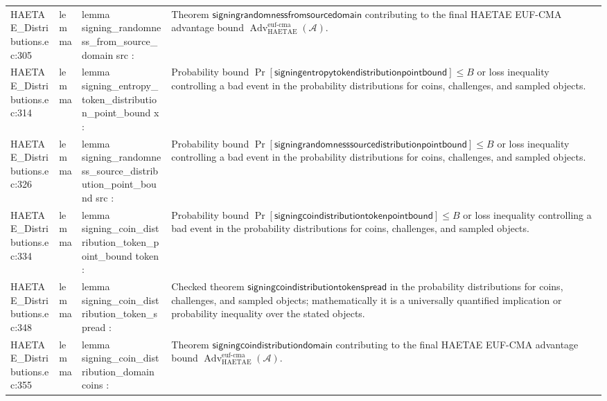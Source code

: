\documentclass[10pt]{article}
\newcommand{\Adv}{\operatorname{Adv}}
\begin{document}
\begin{longtable}{L{0.11\textwidth}L{0.055\textwidth}L{0.385\textwidth}L{0.41\textwidth}}
HAETAE\_\allowbreak{}Distributions.\allowbreak{}ec:\allowbreak{}305 & lemma & {\ttfamily\scriptsize lemma signing\_\allowbreak{}randomness\_\allowbreak{}from\_\allowbreak{}source\_\allowbreak{}domain src :} & Theorem $\mathsf{signingrandomnessfromsourcedomain}$ contributing to the final HAETAE EUF-CMA advantage bound $\Adv_{\mathrm{HAETAE}}^{\mathrm{euf\mbox{-}cma}}(\mathcal A)$. \\
HAETAE\_\allowbreak{}Distributions.\allowbreak{}ec:\allowbreak{}314 & lemma & {\ttfamily\scriptsize lemma signing\_\allowbreak{}entropy\_\allowbreak{}token\_\allowbreak{}distribution\_\allowbreak{}point\_\allowbreak{}bound x :} & Probability bound $\Pr[\mathsf{signingentropytokendistributionpointbound}]\le B$ or loss inequality controlling a bad event in the probability distributions for coins, challenges, and sampled objects. \\
HAETAE\_\allowbreak{}Distributions.\allowbreak{}ec:\allowbreak{}326 & lemma & {\ttfamily\scriptsize lemma signing\_\allowbreak{}randomness\_\allowbreak{}source\_\allowbreak{}distribution\_\allowbreak{}point\_\allowbreak{}bound src :} & Probability bound $\Pr[\mathsf{signingrandomnesssourcedistributionpointbound}]\le B$ or loss inequality controlling a bad event in the probability distributions for coins, challenges, and sampled objects. \\
HAETAE\_\allowbreak{}Distributions.\allowbreak{}ec:\allowbreak{}334 & lemma & {\ttfamily\scriptsize lemma signing\_\allowbreak{}coin\_\allowbreak{}distribution\_\allowbreak{}token\_\allowbreak{}point\_\allowbreak{}bound token :} & Probability bound $\Pr[\mathsf{signingcoindistributiontokenpointbound}]\le B$ or loss inequality controlling a bad event in the probability distributions for coins, challenges, and sampled objects. \\
HAETAE\_\allowbreak{}Distributions.\allowbreak{}ec:\allowbreak{}348 & lemma & {\ttfamily\scriptsize lemma signing\_\allowbreak{}coin\_\allowbreak{}distribution\_\allowbreak{}token\_\allowbreak{}spread :} & Checked theorem $\mathsf{signingcoindistributiontokenspread}$ in the probability distributions for coins, challenges, and sampled objects; mathematically it is a universally quantified implication or probability inequality over the stated objects. \\
HAETAE\_\allowbreak{}Distributions.\allowbreak{}ec:\allowbreak{}355 & lemma & {\ttfamily\scriptsize lemma signing\_\allowbreak{}coin\_\allowbreak{}distribution\_\allowbreak{}domain coins :} & Theorem $\mathsf{signingcoindistributiondomain}$ contributing to the final HAETAE EUF-CMA advantage bound $\Adv_{\mathrm{HAETAE}}^{\mathrm{euf\mbox{-}cma}}(\mathcal A)$. \\

\end{longtable}
\end{document}
